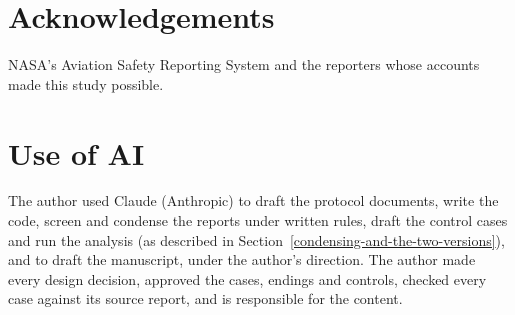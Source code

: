 \documentclass[11pt]{article}
\begin{document}
\section*{Acknowledgements}
NASA's Aviation Safety Reporting System and the reporters whose accounts made this study possible.

\section*{Use of AI}
The author used Claude (Anthropic) to draft the protocol documents, write the code, screen and condense the reports under written rules, draft the control cases and run the analysis (as described in Section~\ref{condensing-and-the-two-versions}), and to draft the manuscript, under the author's direction. The author made every design decision, approved the cases, endings and controls, checked every case against its source report, and is responsible for the content.
\end{document}
